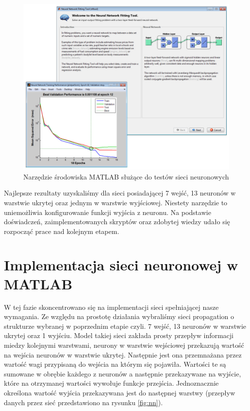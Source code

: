 \begin{figure}[tbph!]
	\centering
	\includegraphics[width=0.9\linewidth]{images/matlabnn.jpg}
	\caption{Narzędzie środowiska MATLAB służące do testów sieci neuronowych}
	\label{fig:nnmatlab}
\end{figure}

Najlepsze rezultaty uzyskaliśmy dla sieci posiadającej 7 wejść, 13 neuronów w warstwie ukrytej oraz jednym w warstwie wyjściowej. Niestety narzędzie to uniemożliwia konfigurowanie funkcji wyjścia z neuronu. Na podstawie doświadczeń, zaimplementowanych skryptów oraz zdobytej wiedzy udało się rozpocząć prace nad kolejnym etapem.

\section{Implementacja sieci neuronowej w MATLAB}
W tej fazie skoncentrowano się na implementacji sieci spełniającej nasze wymagania. Ze względu na prostotę działania wybraliśmy sieci propagation o strukturze wybranej w poprzednim etapie czyli. 7 wejść, 13 neuronów w warstwie ukrytej oraz 1 wyjściu.
Model takiej sieci zakłada prosty przepływ informacji miedzy kolejnymi warstwami, neurony w warstwie wejściowej przekazują wartość na wejścia neuronów w warstwie ukrytej.
Następnie jest ona przemnażana przez wartość wagi przypisaną do wejścia na którym się pojawiła. Wartości te są sumowane w obrębie każdego z neuronów a następnie przekazywane na wyjście, które na otrzymanej wartości wywołuje funkcje przejścia. Jednoznacznie określona wartość wyjścia przekazywana jest do następnej warstwy (przepływ danych przez sieć przedstawiono na rysunku \ref{fig:nn}).

